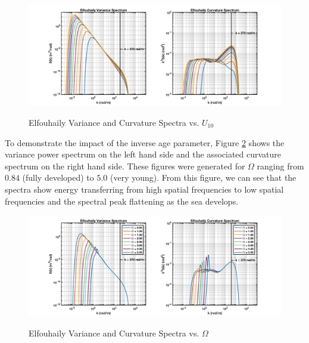 \begin{figure}[H]
  \begin{center}
\includegraphics[width=6in]{../media/Ocean_Surface/elf_variance_curvature_spectrum.png}
  \end{center}
  \renewcommand{\baselinestretch}{1} \small\normalsize
  \begin{quote}
    \caption[Elfouhaily Variance and Curvature Spectra vs. $U_{10}$]{Elfouhaily Variance and Curvature Spectra vs. $U_{10}$\label{os_fig:3}}
  \end{quote}
\end{figure}
\renewcommand{\baselinestretch}{2} \small\normalsize

To demonstrate the impact of the inverse age parameter, Figure \ref{os_fig:3a} shows the variance power spectrum on the left hand side and the associated curvature spectrum on the right hand side. These figures were generated for $\Omega$ ranging from $0.84$ (fully developed) to $5.0$ (very young). From this figure, we can see that the spectra show energy transferring from high spatial frequencies to low spatial frequencies and the spectral peak flattening as the sea develops.

\begin{figure}[H]
  \begin{center}
\includegraphics[width=6in]{../media/Ocean_Surface/elf_variance_curvature_spectrum_age.png}
  \end{center}
  \renewcommand{\baselinestretch}{1} \small\normalsize
  \begin{quote}
    \caption[Elfouhaily Variance and Curvature Spectra vs. $\Omega$]{Elfouhaily Variance and Curvature Spectra vs. $\Omega$ \label{os_fig:3a}}
  \end{quote}
\end{figure}
\renewcommand{\baselinestretch}{2} \small\normalsize

